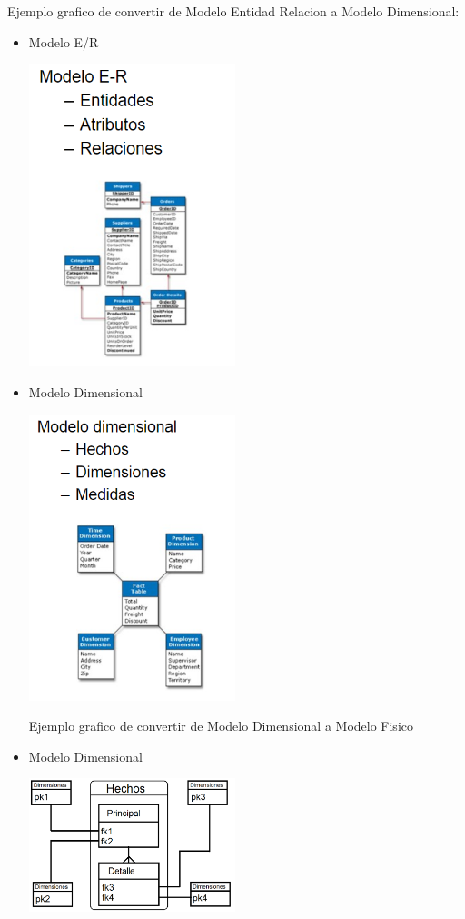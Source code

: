 \documentclass[preprint,12pt]{elsarticle}
\begin{document}
Ejemplo grafico de convertir de Modelo Entidad Relacion a Modelo Dimensional:
\begin{itemize}

	\item Modelo E/R

\begin{center}
	\includegraphics[width=6cm]{./Imagenes/bran1} 
\end{center}

	\item Modelo Dimensional

\begin{center}
	\includegraphics[width=6cm]{./Imagenes/bran2} 
\end{center}

Ejemplo grafico de convertir de Modelo	Dimensional a Modelo Fisico

          \item Modelo Dimensional
\begin{center}
	\includegraphics[width=6cm]{./Imagenes/bran3} 
\end{center}


\end{itemize}
\end{document}

